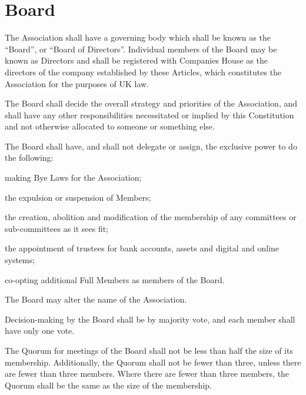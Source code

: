 \documentclass[10pt]{mk-articles-of-association}
\newcommand{\EC}[0]{Board}
\newcommand{\Exec}[0]{\EC{} }
\begin{document}
\section{\Exec}
  \begin{constenum}

  \item The Association shall have a governing body which shall be
    known as the ``\EC{}'', or ``Board of Directors''. Individual
    members of the \Exec may be known as Directors and shall be
    registered with Companies House as the directors of the company
    established by these Articles, which constitutes the Association
    for the purposes of UK law.

  \item The \Exec shall decide the overall strategy and priorities of
    the Association, and shall have any other responsibilities
    necessitated or implied by this Constitution and not otherwise
    allocated to someone or something else.

  \item The \Exec shall have, and
    shall not delegate or assign, the exclusive power to do the
    following:\label{nondelegation}

    \begin{constenum}
      \item making Bye Laws for the Association;

      \item the expulsion or suspension of Members;

      \item the creation, abolition and modification of the membership of
        any committees or sub-committees as it sees fit;

      \item the appointment of trustees for bank accounts, assets and
        digital and online systems; \ITand

      \item co-opting additional Full Members as members of the \EC{}.

    \end{constenum}

  \item The \Exec may alter the name of the Association.

  \item Decision-making by the \Exec shall be by majority vote, and each
    member shall have only one vote.\label{boardvote}

  \item The Quorum for meetings of the \Exec shall not be less than
    half the size of its membership. Additionally, the Quorum shall
    not be fewer than three, unless there are fewer than three
    members. Where there are fewer than three members, the Quorum shall
    be the same as the size of the membership.


\end{constenum}
\end{document}
